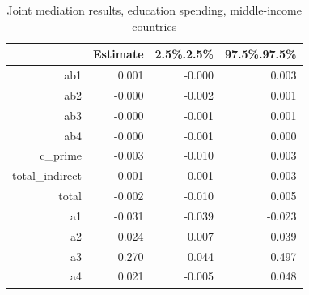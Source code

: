 \begin{table}[ht]
\centering
\begin{tabular}{rrrr}
  \hline
 & Estimate & 2.5\%.2.5\% & 97.5\%.97.5\% \\ 
  \hline
ab1 & 0.001 & -0.000 & 0.003 \\ 
  ab2 & -0.000 & -0.002 & 0.001 \\ 
  ab3 & -0.000 & -0.001 & 0.001 \\ 
  ab4 & -0.000 & -0.001 & 0.000 \\ 
  c\_prime & -0.003 & -0.010 & 0.003 \\ 
  total\_indirect & 0.001 & -0.001 & 0.003 \\ 
  total & -0.002 & -0.010 & 0.005 \\ 
  a1 & -0.031 & -0.039 & -0.023 \\ 
  a2 & 0.024 & 0.007 & 0.039 \\ 
  a3 & 0.270 & 0.044 & 0.497 \\ 
  a4 & 0.021 & -0.005 & 0.048 \\ 
   \hline
\end{tabular}
\caption{Joint mediation results, education spending, middle-income countries} 
\end{table}
